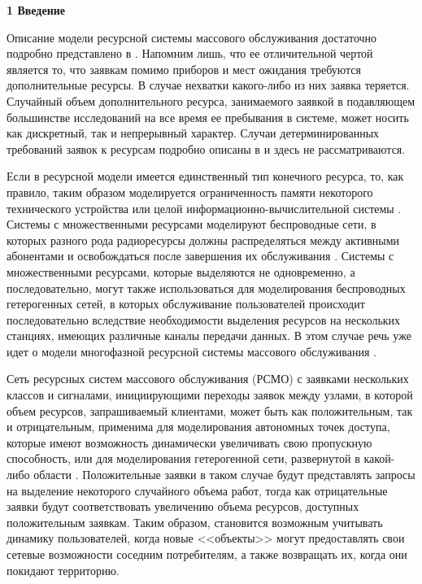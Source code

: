 \documentclass[a4paper,12pt]{article}
\begin{document}
\vspace{\baselineskip}     %

\noindent                  %
\textbf{1 Введение}

Описание модели ресурсной системы массового обслуживания достаточно подробно представлено в \cite{Ch_1}. Напомним лишь, что ее отличительной чертой является то, что заявкам помимо приборов и мест ожидания требуются дополнительные ресурсы. В случае нехватки какого-либо из них заявка теряется.
Случайный объем дополнительного ресурса, занимаемого заявкой в подавляющем большинстве исследований на все время ее пребывания в системе, может носить как дискретный, так и непрерывный характер. Случаи детерминированных требований заявок к ресурсам подробно описаны в \cite{Kelly,Ross,Basharin} и здесь не рассматриваются.

Если в ресурсной модели имеется единственный тип конечного ресурса, то, как правило, таким образом моделируется ограниченность памяти некоторого технического устройства или целой информационно-вычислительной системы \cite{Romm_21_1971,Kac,Tihonenko_27_1985,Pechinkin_29_2012}. Системы с множественными ресурсами моделируют беспроводные сети, в которых разного рода радиоресурсы должны распределяться между активными абонентами и освобождаться после завершения  их обслуживания \cite{Naumov_3_2016}.
Системы с множественными ресурсами, которые выделяются не одновременно, а последовательно, могут также использоваться для моделирования беспроводных гетерогенных сетей, в которых обслуживание пользователей происходит последовательно вследствие необходимости выделения ресурсов на нескольких станциях, имеющих различные каналы передачи данных. В этом случае речь уже идет о модели многофазной ресурсной системы массового обслуживания \cite{Mois_4_2017,Mois_5_2017}.


Сеть ресурсных систем массового обслуживания (РСМО) с заявками нескольких классов и сигналами, инициирующими переходы заявок между узлами, в которой объем ресурсов, запрашиваемый клиентами, может быть как положительным, так и отрицательным, применима для моделирования автономных точек доступа, которые имеют возможность динамически увеличивать свою пропускную способность, или для моделирования гетерогенной сети, развернутой в какой-либо области \cite{Sopin_12_2017,Sopin_13_2017,Naumov_14_2017,Naumov_15_2017}. Положительные заявки в таком случае будут представлять запросы на выделение некоторого случайного объема работ, тогда как отрицательные заявки будут соответствовать увеличению объема ресурсов, доступных положительным заявкам.
Таким образом, становится возможным учитывать динамику пользователей,
когда новые <<объекты>> могут предоставлять свои сетевые возможности соседним потребителям, а также возвращать их, когда они покидают территорию.
\end{document}
